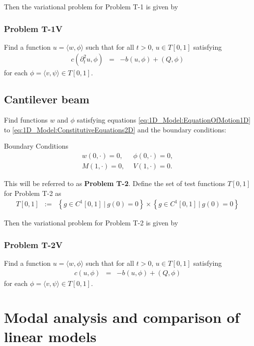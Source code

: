 				Then the variational problem for Problem T-1 is given by
				\subsubsection*{Problem T-1V}\label{sssec:1D_Model:ProblemT1V}
					Find a function ${u} = \langle w, \phi \rangle$ such that for all $t >0$, ${u} \in  T[0,1]$ satisfying
					\begin{eqnarray}
						c(\partial_t^2 u,{\phi}) &=& -b({u},{\phi}) + (Q,{\phi})
					\end{eqnarray} for each ${\phi} = \langle v, \psi \rangle \in T[0,1]$.

			\subsection*{Cantilever beam}
				Find functions $w$ and $\phi$ satisfying equations \eqref{eq:1D_Model:EquationOfMotion1D} to \eqref{eq:1D_Model:ConstitutiveEquations2D} and the boundary conditions:

				{Boundary Conditions}\\
				\begin{eqnarray*}
					w(0,\cdot) = 0, \ \ &\phi(0,\cdot) = 0, \label{eq:1D_Model:ProblemT2BC1}\\
					M(1,\cdot) = 0, \ \ &V(1,\cdot) = 0. \label{eq:1D_Model:ProblemT2BC2}
				\end{eqnarray*}

				This will be referred to as \textbf{Problem T-2}.  Define the set of test functions $T[0,1]$ for Problem T-2 as
				\begin{eqnarray*}
					T[0,1] &:=& \left\{g \in C^1[0,1] \ | \ g(0) = 0 \right\} \times \left\{g \in C^1[0,1] \ | \ g(0) = 0 \right\}
				\end{eqnarray*}

				Then the variational problem for Problem T-2 is given by
				\subsubsection*{Problem T-2V}\label{sssec:1D_Model:ProblemT1V}
					Find a function ${u} = \langle w, \phi \rangle$ such that for all $t >0$, ${u} \in  T[0,1]$ satisfying
					\begin{eqnarray}
						c(u,{\phi}) &=& -b({u},{\phi}) + (Q,{\phi}) \label{var_form_timo}
					\end{eqnarray} for each ${\phi} = \langle v, \psi \rangle \in T[0,1]$. 
			
				
\section{Modal analysis and comparison of linear models}	

